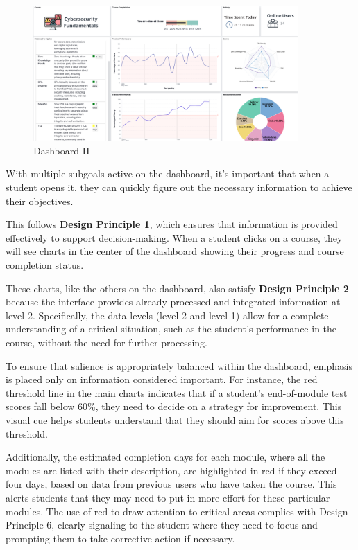 \begin{figure}[H]
    \centering
    \includegraphics[width=0.9\textwidth]{assets/dashboard_2.png}
    \caption{Dashboard II}
    \label{fig:dashboard_2}
\end{figure}

With multiple subgoals active on the dashboard, it’s important that when a student opens it, they can quickly figure out the necessary information to achieve their objectives. 

This follows \textbf{Design Principle 1}, which ensures that information is provided effectively to support decision-making. When a student clicks on a course, they will see charts in the center of the dashboard showing their progress and course completion status.

These charts, like the others on the dashboard, also satisfy \textbf{Design Principle 2} because the interface provides already processed and integrated information at level 2. Specifically, the data levels (level 2 and level 1) allow for a complete understanding of a critical situation, such as the student's performance in the course, without the need for further processing.

To ensure that salience is appropriately balanced within the dashboard, emphasis is placed only on information considered important. For instance, the red threshold line in the main charts indicates that if a student's end-of-module test scores fall below 60\%, they need to decide on a strategy for improvement. This visual cue helps students understand that they should aim for scores above this threshold.

Additionally, the estimated completion days for each module, where all the modules are listed with their description, are highlighted in red if they exceed four days, based on data from previous users who have taken the course. This alerts students that they may need to put in more effort for these particular modules.
The use of red to draw attention to critical areas complies with Design Principle 6, clearly signaling to the student where they need to focus and prompting them to take corrective action if necessary.

